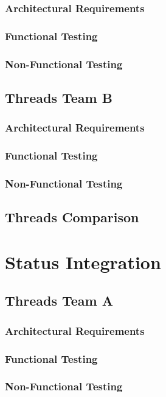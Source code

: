 \documentclass[12pt, oneside]{article}
\begin{document}
		\subsubsection{Architectural Requirements}
		\subsubsection{Functional Testing}
		\subsubsection{Non-Functional Testing }
	
	\subsection{Threads Team B}	
		\subsubsection{Architectural Requirements}
		\subsubsection{Functional Testing}
		\subsubsection{Non-Functional Testing }
	
	\subsection{Threads Comparison}

\section{Status Integration}
	\subsection{Threads Team A}	
		\subsubsection{Architectural Requirements}
		\subsubsection{Functional Testing}
		\subsubsection{Non-Functional Testing }
	
\end{document}
